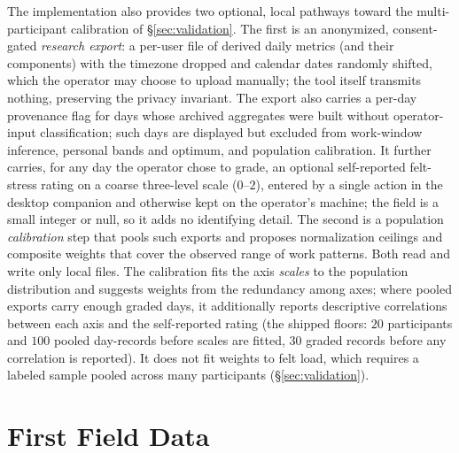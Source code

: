 \documentclass[10pt,twocolumn]{article}
\begin{document}
The implementation also provides two optional, local pathways toward the
multi-participant calibration of \S\ref{sec:validation}. The first is an
anonymized, consent-gated \emph{research export}: a per-user file of derived
daily metrics (and their components) with the timezone dropped and calendar
dates randomly shifted, which the operator may choose to upload manually; the
tool itself transmits nothing, preserving the privacy invariant. The export
also carries a per-day provenance flag for days whose archived aggregates were
built without operator-input classification; such days are displayed but
excluded from work-window inference, personal bands and optimum, and population
calibration. It further carries, for any day the operator chose to grade, an optional
self-reported felt-stress rating on a coarse three-level scale ($0$--$2$),
entered by a single action in the desktop companion and otherwise kept on the
operator's machine; the field is a small integer or null, so it adds no
identifying detail. The second is a population \emph{calibration} step that
pools such exports and proposes normalization ceilings and composite weights
that cover the observed range of work patterns. Both read and write only local
files. The calibration fits the axis \emph{scales} to the population
distribution and suggests weights from the redundancy among axes; where pooled
exports carry enough graded days, it additionally reports descriptive
correlations between each axis and the self-reported rating (the shipped
floors: $20$ participants and $100$ pooled day-records before scales are
fitted, $30$ graded records before any correlation is reported). It does not fit
weights to felt load, which requires a labeled sample pooled across many
participants (\S\ref{sec:validation}).

\section{First Field Data}\label{sec:example}
\end{document}
